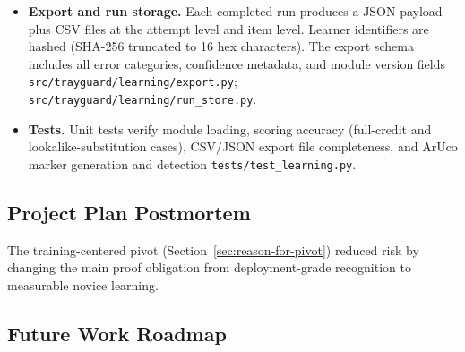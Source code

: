 \documentclass[10pt,a4paper]{article}
\begin{document}
\begin{itemize}
  \item \textbf{Export and run storage.} Each completed run produces a JSON payload plus CSV files at the attempt level and item level. Learner identifiers are hashed (SHA-256 truncated to 16 hex characters). The export schema includes all error categories, confidence metadata, and module version fields \texttt{src/trayguard/learning/export.py}; \texttt{src/trayguard/learning/run\_store.py}.
   \item \textbf{Tests.} Unit tests verify module loading, scoring accuracy (full-credit and lookalike-substitution cases), CSV/JSON export file completeness, and ArUco marker generation and detection \texttt{tests/test\_learning.py}.
\end{itemize}
\subsection{Project Plan Postmortem}

The training-centered pivot (Section~\ref{sec:reason-for-pivot}) reduced risk by changing the main proof obligation from
deployment-grade recognition to measurable novice learning.
\subsection{Future Work Roadmap}
\end{document}
